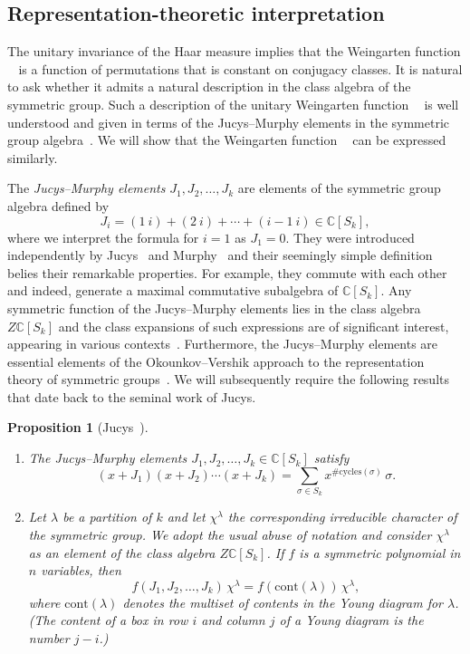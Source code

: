 \documentclass[a4paper]{article}
\theoremstyle{plain}
\newtheorem{proposition}[theorem]{Proposition}
\numberwithin{theorem}{section}
\theoremstyle{definition}
\theoremstyle{remark}
\newcommand{\UM}{\mathbf{U}}			%
\DeclareMathOperator{\UW}{Wg^{\UM}}		%
\newcommand{\SM}{\mathbf{S}}			%
\DeclareMathOperator{\SW}{Wg^{\SM}}		%
\newcommand{\SG}{S} 					%
\begin{document}
\subsection{Representation-theoretic interpretation}

The unitary invariance of the Haar measure implies that the Weingarten function $\SW$ is a function of permutations that is constant on conjugacy classes. It is natural to ask whether it admits a natural description in the class algebra of the symmetric group. Such a description of the unitary Weingarten function $\UW$ is well understood and given in terms of the Jucys--Murphy elements in the symmetric group algebra~\cite{mat-nov13,nov10}. We will show that the Weingarten function $\SW$ can be expressed similarly.


The {\em Jucys--Murphy elements} $J_1, J_2, \ldots, J_k$ are elements of the symmetric group algebra defined by
\[
J_i = (1~i) + (2~i) + \cdots + (i-1~i) \in \mathbb{C}[\SG_k],
\]
where we interpret the formula for $i = 1$ as $J_1 = 0$. They were introduced independently by Jucys~\cite{juc74} and Murphy~\cite{mur81} and their seemingly simple definition belies their remarkable properties. For example, they commute with each other and indeed, generate a maximal commutative subalgebra of $\mathbb{C}[\SG_k]$. Any symmetric function of the Jucys--Murphy elements lies in the class algebra $Z\mathbb{C}[\SG_k]$ and the class expansions of such expressions are of significant interest, appearing in various contexts~\cite{fer12}. Furthermore, the Jucys--Murphy elements are essential elements of the Okounkov--Vershik approach to the representation theory of symmetric groups~\cite{oko-ver96}. We will subsequently require the following results that date back to the seminal work of Jucys.


\begin{proposition} [Jucys~\cite{juc74}] \label{prop:jucys} ~
\begin{enumerate}[label=(\alph*)]
\item The Jucys--Murphy elements $J_1, J_2, \ldots, J_k \in \mathbb{C}[\SG_k]$ satisfy
\[
(x + J_1) (x + J_2) \cdots (x + J_k) = \sum_{\sigma \in S_k} x^{\# \mathrm{cycles}(\sigma)} \, \sigma.
\]
\item Let $\lambda$ be a partition of $k$ and let $\chi^\lambda$ the corresponding irreducible character of the symmetric group. We adopt the usual abuse of notation and consider $\chi^\lambda$ as an element of the class algebra $Z\mathbb{C}[\SG_k]$. If $f$ is a symmetric polynomial in $n$ variables, then
\[
f(J_1, J_2, \ldots, J_k) \, \chi^\lambda = f( \mathrm{cont}(\lambda) ) \, \chi^\lambda,
\]
where $\mathrm{cont}(\lambda)$ denotes the multiset of contents in the Young diagram for $\lambda$. (The content of a box in row $i$ and column $j$ of a Young diagram is the number $j-i$.)
\end{enumerate}
\end{proposition}
\end{document}
